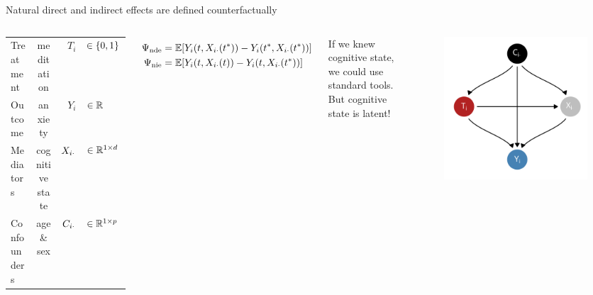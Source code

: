 \documentclass[aspectratio=169]{beamer}
\theoremstyle{remark}
\begin{document}
\begin{frame}{Natural direct and indirect effects are defined counterfactually}
    \begin{columns}
        \begin{table}[]
            \begin{tabular}{lcrl}
                Treatment   & meditation      & $T_i$          & $\in \{0, 1\} $     \\
                Outcome     & anxiety         & $Y_i$          & $\in \mathbb{R}$              \\
                Mediators   & cognitive state & $X_{i \cdot}$ & $\in \mathbb{R}^{1 \times d}$ \\
                Confounders & age \& sex      & $C_{i \cdot}$ & $\in \mathbb{R}^{1 \times p}$
            \end{tabular}
        \end{table}
        \begin{align*}
            \nde & = \E{Y_i (t, \X_{i \cdot}(t^*)) - Y_i (t^*, \X_{i \cdot} (t^*))} \\
            \nie & = \E{Y_i (t, \X_{i \cdot}(t)) - Y_i (t, \X_{i \cdot} (t^*))}
        \end{align*}

        If we knew cognitive state, we could use standard tools. But cognitive state is latent!
        \centering
        \begin{figure}[ht]
            \includegraphics[width=\textwidth]{figures/dags/mediating.png}
            \centering
        \end{figure}
    \end{columns}
\end{frame}
\end{document}
